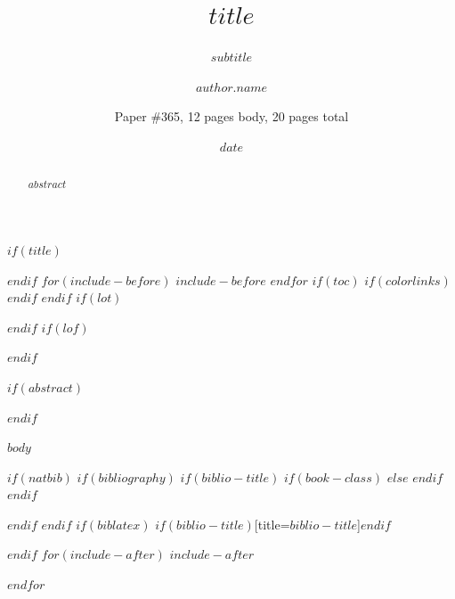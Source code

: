 \documentclass[letterpaper,twocolumn,10pt,sigconf,nonacm]{article}
\title{$title$}
\subtitle{$subtitle$}
\author{$author.name$}
\affiliation{\institution{$author.affiliation$}}
\author{
\normalfont
Paper \#365, 12 pages body, 20 pages total \\
}
\date{$date$}
\begin{document}
$if(title)$
\maketitle
$endif$
$for(include-before)$
$include-before$
$endfor$
$if(toc)$
{
$if(colorlinks)$
\hypersetup{linkcolor=$if(toccolor)$$toccolor$$else$black$endif$}
$endif$
\setcounter{tocdepth}{$toc-depth$}
\tableofcontents
}
$endif$
$if(lot)$
\listoftables
$endif$
$if(lof)$
\listoffigures
$endif$

$if(abstract)$
\begin{abstract}
$abstract$
\end{abstract}
$endif$

$body$

\fi
$if(natbib)$
$if(bibliography)$
$if(biblio-title)$
$if(book-class)$
\renewcommand\bibname{$biblio-title$}
$else$
\renewcommand\refname{$biblio-title$}
$endif$
$endif$
{\small\balance}

$endif$
$endif$
$if(biblatex)$
\printbibliography$if(biblio-title)$[title=$biblio-title$]$endif$

$endif$
$for(include-after)$
$include-after$

$endfor$
\end{document}
